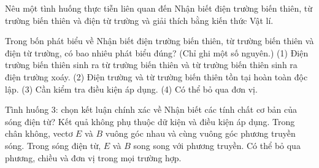 \begin{bt}
Nêu một tình huống thực tiễn liên quan đến Nhận biết điện trường biến thiên, từ trường biến thiên và điện từ trường và giải thích bằng kiến thức Vật lí.
\end{bt}

\begin{ex}
Trong bốn phát biểu về Nhận biết điện trường biến thiên, từ trường biến thiên và điện từ trường, có bao nhiêu phát biểu đúng? (Chỉ ghi một số nguyên.) (1) Điện trường biến thiên sinh ra từ trường biến thiên và từ trường biến thiên sinh ra điện trường xoáy. (2) Điện trường và từ trường biến thiên tồn tại hoàn toàn độc lập. (3) Cần kiểm tra điều kiện áp dụng. (4) Có thể bỏ qua đơn vị.
\end{ex}

\begin{ex}
Tình huống 3: chọn kết luận chính xác về Nhận biết các tính chất cơ bản của sóng điện từ?
\choice
{Kết quả không phụ thuộc dữ kiện và điều kiện áp dụng.}
{\True Trong chân không, vectơ $E$ và $B$ vuông góc nhau và cùng vuông góc phương truyền sóng.}
{Trong sóng điện từ, $E$ và $B$ song song với phương truyền.}
{Có thể bỏ qua phương, chiều và đơn vị trong mọi trường hợp.}
\end{ex}

